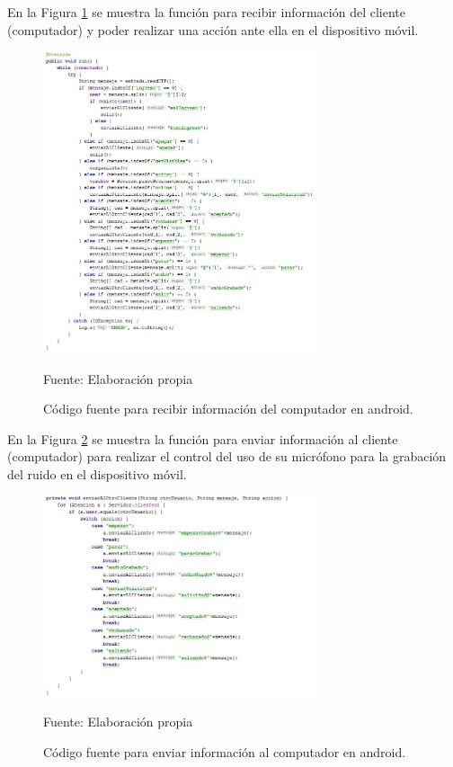 En la Figura \ref{fig:figura3.67} se muestra la función para recibir información del cliente (computador) y poder realizar una acción ante ella en el dispositivo móvil.
\begin{figure}[H]
\captionsetup{justification=centering}
\begin{center}
\includegraphics[width=0.72\textwidth]{Imagenes/Cap3/image067}
\end{center}
\begin{center}
\vskip -0.5cm
\caption{\small{Código fuente para recibir información del computador en android.}}
\label{fig:figura3.67}
{\small{Fuente: Elaboración propia}}
\end{center}
\end{figure}
\newpage
En la Figura \ref{fig:figura3.68} se muestra la función para enviar información al cliente (computador) para realizar el control del uso de su micrófono para la grabación del ruido en el dispositivo móvil.
\begin{figure}[H]
\captionsetup{justification=centering}
\begin{center}
\includegraphics[width=0.72\textwidth]{Imagenes/Cap3/image068}
\end{center}
\begin{center}
\vskip -0.5cm
\caption{\small{Código fuente para enviar información al computador en android.}}
\label{fig:figura3.68}
{\small{Fuente: Elaboración propia}}
\end{center}
\end{figure}

